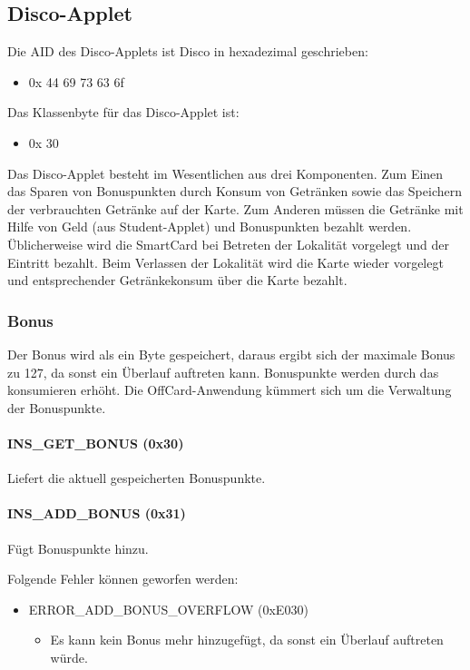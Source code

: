 \subsection{Disco-Applet}
Die AID des Disco-Applets ist Disco in hexadezimal geschrieben:
\begin{itemize}
	\item 0x 44 69 73 63 6f
\end{itemize}
Das Klassenbyte für das Disco-Applet ist:
\begin{itemize}
	\item 0x 30
\end{itemize}

Das Disco-Applet besteht im Wesentlichen aus drei Komponenten.
Zum Einen das Sparen von Bonuspunkten durch Konsum von Getränken sowie das Speichern der verbrauchten Getränke auf der Karte.
Zum Anderen müssen die Getränke mit Hilfe von Geld (aus Student-Applet) und Bonuspunkten bezahlt werden. 
Üblicherweise wird die SmartCard bei Betreten der Lokalität vorgelegt und der Eintritt bezahlt.
Beim Verlassen der Lokalität wird die Karte wieder vorgelegt und entsprechender Getränkekonsum über die Karte bezahlt.

\subsubsection{Bonus}
Der Bonus wird als ein Byte gespeichert, daraus ergibt sich der maximale Bonus zu 127, da sonst ein Überlauf auftreten kann.
Bonuspunkte werden durch das konsumieren erhöht.
Die OffCard-Anwendung kümmert sich um die Verwaltung der Bonuspunkte.

\paragraph{INS\_GET\_BONUS (0x30)}
Liefert die aktuell gespeicherten Bonuspunkte.
\paragraph{INS\_ADD\_BONUS (0x31)}
Fügt Bonuspunkte hinzu.

Folgende Fehler können geworfen werden:
\begin{itemize}
	\item ERROR\_ADD\_BONUS\_OVERFLOW (0xE030)
	\begin{itemize}
		\item Es kann kein Bonus mehr hinzugefügt, da sonst ein Überlauf auftreten würde.
	\end{itemize}
\end{itemize}
